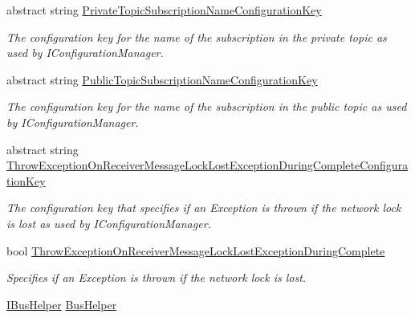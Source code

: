 \begin{DoxyCompactItemize}
abstract string \hyperlink{classCqrs_1_1Azure_1_1ServiceBus_1_1AzureServiceBus_adb82030e0e3ba17347e7fd6a2c68fc91_adb82030e0e3ba17347e7fd6a2c68fc91}{Private\+Topic\+Subscription\+Name\+Configuration\+Key}
\begin{DoxyCompactList}\small\item\em The configuration key for the name of the subscription in the private topic as used by I\+Configuration\+Manager. \end{DoxyCompactList}\item 
abstract string \hyperlink{classCqrs_1_1Azure_1_1ServiceBus_1_1AzureServiceBus_afd2996c47ea248fd1b70ad8077dcd215_afd2996c47ea248fd1b70ad8077dcd215}{Public\+Topic\+Subscription\+Name\+Configuration\+Key}
\begin{DoxyCompactList}\small\item\em The configuration key for the name of the subscription in the public topic as used by I\+Configuration\+Manager. \end{DoxyCompactList}\item 
abstract string \hyperlink{classCqrs_1_1Azure_1_1ServiceBus_1_1AzureServiceBus_a29a4fb4d6f85c649e699cd5e7f0b4d1d_a29a4fb4d6f85c649e699cd5e7f0b4d1d}{Throw\+Exception\+On\+Receiver\+Message\+Lock\+Lost\+Exception\+During\+Complete\+Configuration\+Key}
\begin{DoxyCompactList}\small\item\em The configuration key that specifies if an Exception is thrown if the network lock is lost as used by I\+Configuration\+Manager. \end{DoxyCompactList}\item 
bool \hyperlink{classCqrs_1_1Azure_1_1ServiceBus_1_1AzureServiceBus_afd7c5f3b9caa1ce88bcd8be049bbf099_afd7c5f3b9caa1ce88bcd8be049bbf099}{Throw\+Exception\+On\+Receiver\+Message\+Lock\+Lost\+Exception\+During\+Complete}
\begin{DoxyCompactList}\small\item\em Specifies if an Exception is thrown if the network lock is lost. \end{DoxyCompactList}\item 
\hyperlink{interfaceCqrs_1_1Bus_1_1IBusHelper}{I\+Bus\+Helper} \hyperlink{classCqrs_1_1Azure_1_1ServiceBus_1_1AzureServiceBus_aba45a2bece8e265b9f06695b1e90a2a1_aba45a2bece8e265b9f06695b1e90a2a1}{Bus\+Helper}

\end{DoxyCompactItemize}
